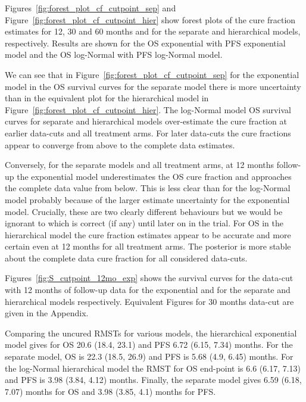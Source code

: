\documentclass[AMA,STIX1COL]{WileyNJD-v2}
\begin{document}
Figures~\ref{fig:forest_plot_cf_cutpoint_sep} and Figure~\ref{fig:forest_plot_cf_cutpoint_hier} show forest plots of the cure fraction estimates for 12, 30 and 60 months and for the separate and hierarchical models, respectively.
Results are shown for the OS exponential with PFS exponential model and the OS log-Normal with PFS log-Normal model.

We can see that in Figure~\ref{fig:forest_plot_cf_cutpoint_sep} for the exponential model in the OS survival curves for the separate model there is more uncertainty than in the equivalent plot for the hierarchical model in Figure~\ref{fig:forest_plot_cf_cutpoint_hier}.
The log-Normal model OS survival curves for separate and hierarchical models over-estimate the cure fraction at earlier data-cuts and all treatment arms.
For later data-cuts the cure fractions appear to converge from above to the complete data estimates.

Conversely, for the separate models and all treatment arms, at 12 months follow-up the exponential model underestimates the OS cure fraction and approaches the complete data value from below.
This is less clear than for the log-Normal model probably because of the larger estimate uncertainty for the exponential model.
Crucially, these are two clearly different behaviours but we would be ignorant to which is correct (if any) until later on in the trial.
For OS in the hierarchical model the cure fraction estimates appear to be accurate and more certain even at 12 months for all treatment arms.
The posterior is more stable about the complete data cure fraction for all considered data-cuts.


Figures~\ref{fig:S_cutpoint_12mo_exp} shows the survival curves for the data-cut with 12 months of follow-up data for the exponential and for the separate and hierarchical models respectively.
Equivalent Figures for 30 months data-cut are given in the Appendix.

Comparing the uncured RMSTs for various models,
the hierarchical exponential model gives for OS 20.6 (18.4, 23.1) and PFS 6.72 (6.15, 7.34) months.
For the separate model, OS is 22.3 (18.5, 26.9) and PFS is 5.68 (4.9, 6.45) months.
For the log-Normal hierarchical model the RMST for OS end-point is 6.6 (6.17, 7.13) and PFS is 3.98 (3.84, 4.12) months.
Finally, the separate model gives 6.59 (6.18, 7.07) months for OS and 3.98 (3.85, 4.1) months for PFS.
\end{document}
